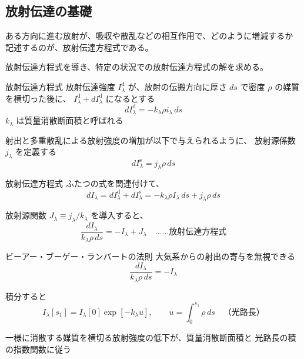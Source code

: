 \documentclass[unicode,colorlinks]{beamer}
\begin{document}



\begin{frame}
	\section{放射伝達の基礎}
	ある方向に進む放射が、吸収や散乱などの相互作用で、どのように増減するか
	記述するのが、放射伝達方程式である。

	放射伝達方程式を導き、特定の状況での放射伝達方程式の解を求める。
\end{frame}

\begin{frame}{放射伝達方程式}
	放射伝達強度 $I_\lambda^\mathrm{d}$ が、放射の伝搬方向に厚さ $ds$ で密度 $\rho$ の媒質を横切った後に、
	$I_\lambda^\mathrm{d}+dI_\lambda^\mathrm{d}$ になるとする
	\[dI_\lambda^\mathrm{d}=-k_\lambda\rho i_\lambda\,ds\]
	$k_\lambda$ は質量消散断面積と呼ばれる

	射出と多重散乱による放射強度の増加が以下で与えられるように、
	放射源係数 $j_\lambda$ を定義する
	\[dI_\lambda^\mathrm{s}=j_\lambda\rho\,ds\]
\end{frame}

\begin{frame}{放射伝達方程式}
	ふたつの式を関連付けて、
	\[dI_\lambda=dI_\lambda^\mathrm{d}+dI_\lambda^\mathrm{s}=-k_\lambda\rho I_\lambda\,ds+j_\lambda\rho\,ds\]

	放射源関数 $J_\lambda\equiv j_\lambda/k_\lambda$ を導入すると、
	\[\frac{dI_\lambda}{k_\lambda\rho\,ds}=-I_\lambda+J_\lambda\quad\text{……放射伝達方程式}\]
\end{frame}

\begin{frame}{ビーアー・ブーゲー・ランバートの法則}
	大気系からの射出の寄与を無視できる
	\[\frac{dI_\lambda}{k_\lambda\rho\,ds}=-I_\lambda\]

	積分すると
	\[I_\lambda[s_1]=I_\lambda[0]\exp[-k_\lambda u],\qquad u=\int^{s_1}_0\rho\,ds\quad\text{（光路長）}\]

	一様に消散する媒質を横切る放射強度の低下が、質量消散断面積と
	光路長の積の指数関数に従う
\end{frame}
\end{document}
